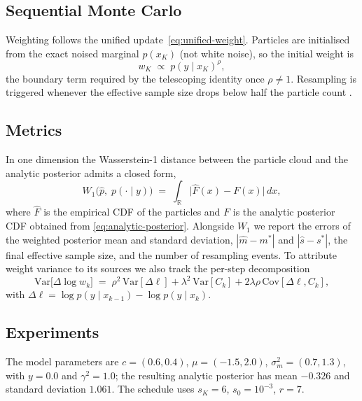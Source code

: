 \documentclass[11pt]{article}
\newcommand{\R}{\mathbb{R}}
\begin{document}
\subsection{Sequential Monte Carlo}

Weighting follows the unified update~\eqref{eq:unified-weight}.
Particles are initialised from the exact noised marginal $p(x_K)$
(not white noise), so the initial weight is
\begin{equation}\label{eq:boundary-weight}
  w_K \;\propto\; p(y\mid x_K)^\rho,
\end{equation}
the boundary term required by the telescoping identity once $\rho\neq 1$.
Resampling is triggered whenever the effective sample size drops below
half the particle count \citep{chopin2020smc}.

\subsection{Metrics}

In one dimension the Wasserstein-1 distance between the particle cloud and the analytic
posterior admits a closed form,
\begin{equation}\label{eq:W1}
  W_1\bigl(\hat p,\; p(\cdot\mid y)\bigr)
  \;=\; \int_{\R} \bigl| \hat F(x) - F(x) \bigr|\,dx,
\end{equation}
where $\hat F$ is the empirical CDF of the particles and $F$ is the analytic posterior
CDF obtained from \eqref{eq:analytic-posterior}.
Alongside $W_1$ we report the errors of the weighted posterior mean and standard
deviation, $|\hat m-m^\ast|$ and $|\hat s-s^\ast|$, the final effective sample size, and
the number of resampling events.
To attribute weight variance to its sources we also track the per-step decomposition
\begin{equation}\label{eq:weight-variance}
  \mathrm{Var}\bigl[\Delta\log w_k\bigr]
  \;=\; \rho^2\,\mathrm{Var}[\Delta\ell]
        + \lambda^2\,\mathrm{Var}[C_k]
        + 2\lambda\rho\,\mathrm{Cov}[\Delta\ell, C_k],
\end{equation}
with $\Delta\ell=\log p(y\mid x_{k-1})-\log p(y\mid x_k)$.

\subsection{Experiments}\label{sec:toy-k-sweep}

The model parameters are $c=(0.6,0.4)$, $\mu=(-1.5,2.0)$,
$\sigma_m^2=(0.7,1.3)$, with $y=0.0$ and $\gamma^2=1.0$; the resulting
analytic posterior has mean $-0.326$ and standard deviation $1.061$.
The schedule uses $s_K=6$, $s_0=10^{-3}$, $r=7$.
\end{document}
